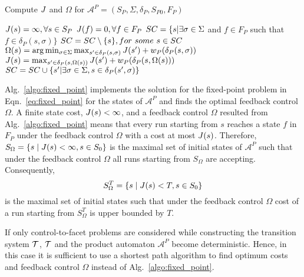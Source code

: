 \documentclass{ifacconf}
\newcommand{\TS}{{\cal T}}
\newcommand{\AUTOMATON}{\ensuremath{\mathcal{A}}}
\begin{document}
	
\begin{algorithm}\caption{\small{Compute $J$ and $\Omega$ for  $\AUTOMATON^P = (S_P, \Sigma, \delta_P, S_{P0}, F_P)$}}
\label{algo:fixed_point}
\small{
\begin{algorithmic}[1]
	\State $J(s) = \infty, \forall s\in S_P$
	\State $J(f) = 0, \forall f \in F_P$
	\State ${SC} = \{ s | \exists \sigma \in \Sigma$ and $f \in F_P$ such that $f \in \delta_P(s,\sigma)\}$
	\While{ $ \ControlSet \neq \emptyset$}
		\State ${SC} = {SC} \setminus \{ s\}, for\ some\ s \in {SC}$
			 \label{alg:update_rule}
				\State $\Omega(s) = \arg \min_{\sigma \in \Sigma} \max_{s' \in \delta_P(s,\sigma)} J(s') + w_P(\delta_P(s,\sigma))$			
				\State $J(s) =  \max_{s' \in \delta_P(s, \Omega(s))} J(s') +  w_P(\delta_P(s,\Omega(s)))$
				\State ${SC} = {SC} \cup \{ s' | \exists \sigma \in \Sigma, s \in \delta_P(s',\sigma)\}$
			\EndIf
	\EndWhile
\end{algorithmic}
}
\end{algorithm}

Alg.~\ref{algo:fixed_point} implements the solution for the fixed-point problem in Eqn.~\eqref{eq:fixed_point} for the states of $\AUTOMATON^P$
and finds the optimal feedback control $\Omega$. 
A finite state cost, $J(s)< \infty$, and a feedback control $\Omega$ resulted from Alg.~\ref{algo:fixed_point} means that every run starting from $s$ reaches a state $f$ in $F_P$ under the feedback control $\Omega$ with a cost at most $J(s)$. Therefore, $S_{\Omega} = \{ s \mid J(s) < \infty ,  s \in S_0\}$ is the maximal set of initial states of $\AUTOMATON^P$ such that under the feedback control $\Omega$ all runs starting from $S_{\Omega}$ are accepting. 
Consequently, 
\begin{equation}\label{eq:s_omegaT}
S_{\Omega}^T = \{ s \mid J(s) < T ,  s \in S_0\}
\end{equation} 
is the maximal set of initial states such that under the feedback control $\Omega$ cost of a run starting from $S_{\Omega}^T$ is upper bounded by $T$.

If only control-to-facet problems are considered while constructing the transition system $\TS$, $\TS$ and the product automaton $\AUTOMATON^P$ become deterministic. Hence, in this case it is sufficient to use a shortest path algorithm to find optimum costs and feedback control $\Omega$ instead of Alg.~\ref{algo:fixed_point}.
\end{document}
